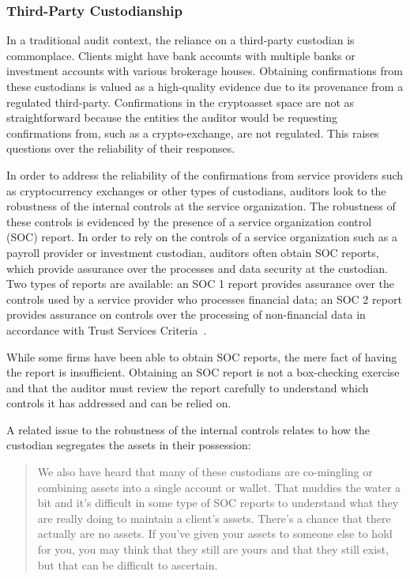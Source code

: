 \subsubsection{Third-Party Custodianship}\label{sec:auditing:framework:ownership:custodianship}
In a traditional audit context, the reliance on a third-party custodian is commonplace. Clients might have bank accounts with multiple banks or investment accounts with various brokerage houses. Obtaining confirmations from these custodians is valued as a high-quality evidence due to its provenance from a regulated third-party. Confirmations in the cryptoasset space are not as straightforward because the entities the auditor would be requesting confirmations from, such as a crypto-exchange, are not regulated. This raises questions over the reliability of their responses. 

In order to address the reliability of the confirmations from service providers such as cryptocurrency exchanges or other types of custodians, auditors look to the robustness of the internal controls at the service organization. The robustness of these controls is evidenced by the presence of a service organization control (SOC) report. In order to rely on the controls of a service organization such as a payroll provider or investment custodian, auditors often obtain SOC reports, which provide assurance over the processes and data security at the custodian. Two types of reports are available: an SOC 1 report provides assurance over the controls used by a service provider who processes financial data; an SOC 2 report provides assurance on controls over the processing of non-financial data in accordance with Trust Services Criteria~\cite{bdosocreports}. 

While some firms have been able to obtain SOC reports, the mere fact of having the report is insufficient. Obtaining an SOC report is not a box-checking exercise and that the auditor must review the report carefully to understand which controls it has addressed and can be relied on.

A related issue to the robustness of the internal controls relates to how the custodian segregates the assets in their possession: 

\begin{quote}
We also have heard that many of these custodians are co-mingling or combining assets into a single account or wallet. That muddies the water a bit and it's difficult in some type of SOC reports to understand what they are really doing to maintain a client's assets. There's a chance that there actually are no assets. If you've given your assets to someone else to hold for you, you may think that they still are yours and that they still exist, but that can be difficult to ascertain.
\end{quote}

